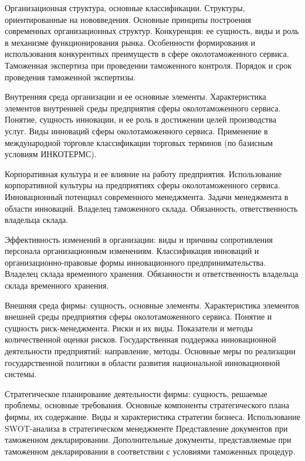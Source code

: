 \documentclass[
	11pt,
	a4paper,
	]
	{article}
\begin{document}
\bigskip

\noindent{} 
	{
		Организационная структура, основные классификации. Структуры, ориентированные на нововведения. Основные принципы построения современных организационных структур.
	}{
		Конкуренция: ее сущность, виды и роль в механизме функционирования рынка. Особенности формирования и использования конкурентных преимуществ в сфере околотаможенного сервиса.
	}{
		Таможенная экспертиза при проведении таможенного контроля. Порядок и срок проведения таможенной экспертизы.
	}

\bigskip

\noindent{} 
	{
		Внутренняя среда организации и ее основные элементы. Характеристика элементов внутренней среды предприятия сферы околотаможенного сервиса.
	}{
		Понятие, сущность инновации, и ее роль в достижении целей производства услуг. Виды инноваций сферы околотаможенного сервиса.
	}{
		Применение в международной торговле классификации торговых терминов (по базисным условиям ИНКОТЕРМС).
	}

\bigskip

\noindent{} 
	{
		Корпоративная культура и ее влияние на работу предприятия. Использование корпоративной культуры на предприятиях сферы околотаможенного сервиса.
	}{
		Инновационный потенциал современного менеджмента. Задачи менеджмента в области инноваций.
	}{
		Владелец таможенного склада. Обязанность, ответственность владельца склада.
	}

\bigskip

\noindent{} 
	{
		Эффективность изменений в организации: виды и причины сопротивления персонала организационным изменениям.
	}{
		Классификация инноваций и организационно-правовые формы инновационного предпринимательства.
	}{
		Владелец склада временного хранения. Обязанности и ответственность владельца склада временного хранения.
	}

\bigskip

\noindent{} 
	{
		Внешняя среда фирмы: сущность, основные элементы. Характеристика элементов внешней среды предприятия сферы околотаможенного сервиса.
	}{
		Понятие и сущность риск-менеджмента. Риски и их виды. Показатели и методы количественной оценки рисков.
	}{
		Государственная поддержка инновационной деятельности предприятий: направление, методы. Основные меры по реализации государственной политики в области развития национальной инновационной системы.
	}

\bigskip

\noindent{} 
	{
		Стратегическое планирование деятельности фирмы: сущность, решаемые проблемы, основные требования. Основные компоненты стратегического плана фирмы, их содержание.
	}{
		Виды и характеристика стратегии бизнеса. Использование SWOT-анализа в стратегическом менеджменте
	}{
		Представление документов при таможенном декларировании. Дополнительные документы, представляемые при таможенном декларировании в соответствии с условиями таможенных процедур.
	}
\end{document}
